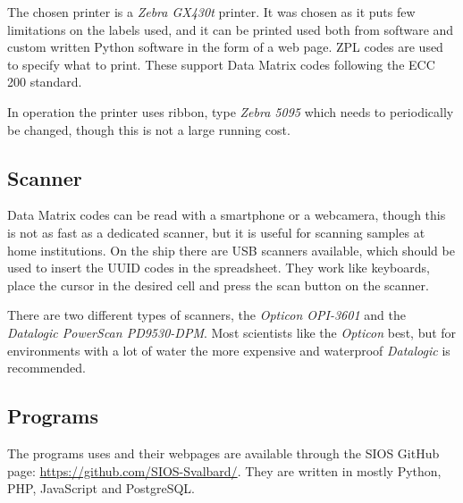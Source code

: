 \documentclass[a4paper,english, 11pt]{article}
\begin{document}
The chosen printer is a \emph{Zebra GX430t} printer. It was chosen as it puts few limitations on the labels used, and it can be printed used both from software and custom written Python software in the form of a web page. ZPL codes are used to specify what to print. These support Data Matrix codes following the ECC 200 standard.


In operation the printer uses ribbon, type \emph{Zebra 5095} which needs to periodically be changed, though this is not a large running cost.

\subsection{Scanner} %
\label{sub:Scanner}

Data Matrix codes can be read with a smartphone or a webcamera, though this is not as fast as a dedicated scanner, but it is useful for scanning samples at home institutions. On the ship there are USB scanners available, which should be used to insert the UUID codes in the spreadsheet. They work like keyboards, place the cursor in the desired cell and press the scan button on the scanner.

There are two different types of scanners, the \emph{Opticon OPI-3601} and the \emph{Datalogic PowerScan PD9530-DPM}. Most scientists like the \emph{Opticon} best, but for environments with a lot of water the more expensive and waterproof \emph{Datalogic} is recommended.

\subsection{Programs} %
\label{sub:Programs}
The programs uses and their webpages are available through the SIOS GitHub page: \url{https://github.com/SIOS-Svalbard/}. They are written in mostly Python, PHP, JavaScript and PostgreSQL.

\end{document}
